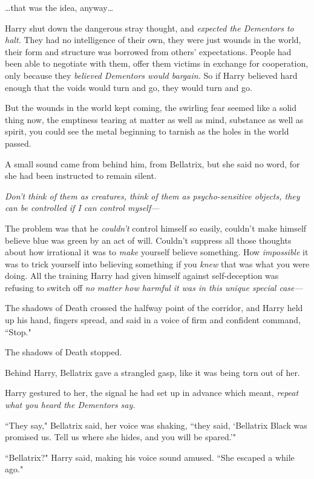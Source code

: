 {\ldots}that was the idea, anyway{\ldots}

Harry shut down the dangerous stray thought, and \emph{expected the Dementors to halt.} They had no intelligence of their own, they were just wounds in the world, their form and structure was borrowed from others' expectations. People had been able to negotiate with them, offer them victims in exchange for cooperation, only because they \emph{believed Dementors would bargain.} So if Harry believed hard enough that the voids would turn and go, they would turn and go.

But the wounds in the world kept coming, the swirling fear seemed like a solid thing now, the emptiness tearing at matter as well as mind, substance as well as spirit, you could see the metal beginning to tarnish as the holes in the world passed.

A small sound came from behind him, from Bellatrix, but she said no word, for she had been instructed to remain silent.

\emph{Don't think of them as creatures, think of them as psycho-sensitive objects, they can be controlled if I can control myself—}

The problem was that he \emph{couldn't} control himself so easily, couldn't make himself believe blue was green by an act of will. Couldn't suppress all those thoughts about how irrational it was to \emph{make} yourself believe something. How \emph{impossible} it was to trick yourself into believing something if you \emph{knew} that was what you were doing. All the training Harry had given himself against self-deception was refusing to switch off \emph{no matter how harmful it was in this unique special case—}

The shadows of Death crossed the halfway point of the corridor, and Harry held up his hand, fingers spread, and said in a voice of firm and confident command, ``Stop."

The shadows of Death stopped.

Behind Harry, Bellatrix gave a strangled gasp, like it was being torn out of her.

Harry gestured to her, the signal he had set up in advance which meant, \emph{repeat what you heard the Dementors say.}

``They say," Bellatrix said, her voice was shaking, ``they said, `Bellatrix Black was promised us. Tell us where she hides, and you will be spared.'"

``Bellatrix?" Harry said, making his voice sound amused. ``She escaped a while ago."

